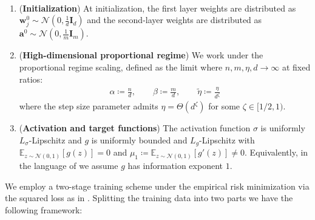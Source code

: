 \begin{assumption}
\label{ass:main-assumptions}~
    \begin{enumerate}[leftmargin=*,topsep=0.5mm, itemsep=0.mm]
        \item(\textbf{Initialization}) At initialization, the first layer weights are distributed as $\bm w^{0}_{j}\sim \mathcal N(0, \frac{1}{d}\bm I_d)$ and the second-layer weights are distributed as $\bm a^{0} \sim \mathcal N(0, \frac{1}{m}\bm I_m)$. 
        \item (\textbf{High-dimensional proportional regime}) We work under the proportional regime scaling, defined as the limit where $n,m,\eta, d\to\infty$ at fixed ratios: \begin{align}\label{eq:joint_limit}
            \alpha \coloneqq \frac{n}{d}, \qquad \beta \coloneqq \frac{m}{d}, \qquad \tilde{\eta}\coloneqq \frac{\eta}{d^\zeta}
        \end{align} where the step size parameter admits $\eta = \Theta(d^{\zeta})$ for some $\zeta \in [1/2, 1)$.
        \item (\textbf{Activation and target functions}) The activation function $\sigma$ is uniformly $L_{\sigma}$-Lipschitz  and $g$ is uniformly bounded and $L_g$-Lipschitz with $\mathbb{E}_{z \sim \mathcal{N}(0,1)}[g(z)]=0$ and $\mu_1 \coloneqq \mathbb{E}_{z\sim \mathcal{N}(0,1)}[g'(z)] \neq 0$. Equivalently, in the language of \cite{arous2021online} we assume $g$ has information exponent $1$.
    \end{enumerate}
\end{assumption}
We employ a two-stage training scheme under the empirical risk minimization via the squared loss as in \cite{ba2022high, dandi2023two, moniri2023theory, cui2024asymptotics, dandi2024random}. Splitting the training data into two parts we have the following framework:
